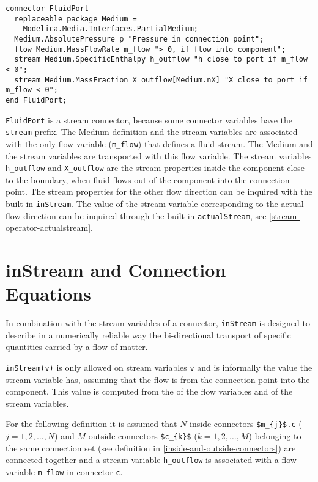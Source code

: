 \begin{example}
\begin{lstlisting}[language=modelica]
connector FluidPort
  replaceable package Medium =
    Modelica.Media.Interfaces.PartialMedium;
  Medium.AbsolutePressure p "Pressure in connection point";
  flow Medium.MassFlowRate m_flow "> 0, if flow into component";
  stream Medium.SpecificEnthalpy h_outflow "h close to port if m_flow < 0";
  stream Medium.MassFraction X_outflow[Medium.nX] "X close to port if m_flow < 0";
end FluidPort;
\end{lstlisting}
\lstinline!FluidPort! is a stream connector, because some connector variables have the \lstinline!stream! prefix.
The Medium definition and the stream variables are associated with the only flow variable (\lstinline!m_flow!) that defines a fluid stream.
The Medium and the stream variables are transported with this flow variable.
The stream variables \lstinline!h_outflow! and \lstinline!X_outflow! are the stream properties inside the component close to the boundary, when fluid flows out of the component into the connection point.
The stream properties for the other flow direction can be inquired with the built-in \lstinline!inStream!.
The value of the stream variable corresponding to the actual flow direction can be inquired through the built-in \lstinline!actualStream!, see
\cref{stream-operator-actualstream}.
\end{example}

\section{inStream and Connection Equations}\label{stream-operator-instream-and-connection-equations}\label{instream-and-connection-equations}

In combination with the stream variables of a connector, \lstinline!inStream! is designed to describe in a numerically reliable way the bi-directional transport of specific quantities carried by a flow of matter.

\lstinline!inStream(v)! is only allowed on stream variables \lstinline!v! and is informally the value the stream variable has, assuming that the flow is from the connection point into the component.
This value is computed from the  of the flow variables and of the stream variables.

For the following definition it is assumed that $N$ inside connectors \lstinline!$m_{j}$.c! ($j = 1, 2, \ldots, N$) and $M$ outside connectors \lstinline!$c_{k}$! ($k = 1, 2, \ldots, M$) belonging to the same connection set (see definition in \cref{inside-and-outside-connectors}) are connected together and a stream variable \lstinline!h_outflow! is associated with a flow variable \lstinline!m_flow! in connector \lstinline!c!.


